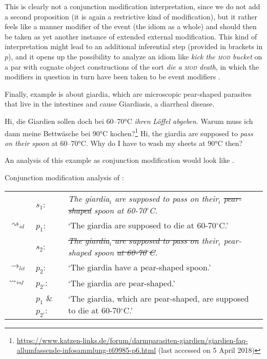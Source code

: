 \documentclass[output=paper]{langsci/langscibook}
\begin{document}
\noindent This is clearly not a conjunction modification interpretation, since we do not add a second proposition (it is again a restrictive kind of modification), but it rather feels like a manner modifier of the event (the idiom as a whole) and should then be taken as yet another instance of extended external modification. This kind of interpretation might lead to an additional inferential step (provided in brackets in $p$), and it opens up the possibility to analyze an idiom like \textit{kick the \textsc{mod} bucket} on a par with cognate object constructions of the sort \textit{die a \textsc{mod} death}, in which the modifiers in question in turn have been taken to be event modifiers \citep[see, e.g.,][]{mittwoch98, sailer10}.

Finally, example  is about giardia, which are microscopic pear-shaped parasites that live in the intestines and cause Giardiasis, a diarrheal disease.

\ea \label{pear-shaped spoon}
Hi, die Giardien sollen doch bei 60--70°C \textit{ihren} \underline{} \textit{Löffel abgeben}. Warum muss ich dann meine Bettwäsche bei 90°C kochen?\footnote{\url{https://www.katzen-links.de/forum/darmparasiten-giardien/giardien-faq-allumfassende-infosammlung-t69985-p6.html} (last accessed on 5 April 2018)}
\glt Hi, the giardia are supposed to \textit{pass on their} \underline{} \textit{spoon} at 60--70°C. Why do I have to wash my sheets at 90°C then?
\z

\noindent An analysis of this example as conjunction modification would look like .

\ea \label{analysis1 pear-shaped spoon} 
Conjunction modification analysis of :\smallskip\\
\begin{tabularx}{\linewidth}[t]{@{}llQ@{}}
& 	$s_{1}$: & \textit{The giardia$_{i}$ are supposed to pass on their$_{i}$ \sout{pear-shaped} spoon at 60-70$^\circ$C.} \\
$\rightsquigarrow_{id}$ & $p_{1}$: & `The giardia are supposed to die at 60-70$^\circ$C.' \medskip\\
& 	$s_{2}$: & \textit{\sout{The giardia$_{i}$ are supposed to pass on} their$_{i}$ pear-shaped spoon \sout{at 60-70$^\circ$C}.}\\
$\rightarrow_{lit}$	&	$p_{2}$: & `The giardia have a pear-shaped spoon.' \\
$\rightsquigarrow_{\text{\itshape inf}}$	&	$p_{2'}$: & `The giardia are pear-shaped.' \\
 &	$p_{1}$ \& $p_{2'}$: & `The giardia, which are pear-shaped, are supposed to die at 60-70$^\circ$C.'\\
\end{tabularx}
\z
\end{document}
